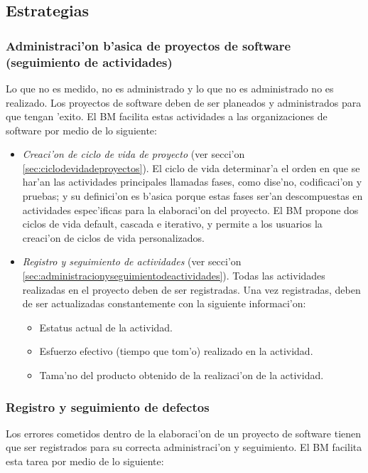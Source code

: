 \subsection{Estrategias}
\label{sec:Estrategias}
\noindent

\subsubsection{Administraci'on b'asica de proyectos de software (seguimiento de actividades)}
\label{sec:Administraci'onb'asicadeproyectosdesoftware}
\noindent
Lo que no es medido, no es administrado y lo que no es administrado no es realizado\cite{Humphrey2002}. Los proyectos de software deben de ser planeados y administrados para que tengan 'exito. El BM facilita estas actividades a las organizaciones de software por medio de lo siguiente:

\begin{itemize}
	\item \emph{Creaci'on de ciclo de vida de proyecto} (ver secci'on \ref{sec:ciclodevidadeproyectos}). El ciclo de vida determinar'a el orden en que se har'an las actividades principales llamadas fases, como dise'no, codificaci'on y pruebas; y su definici'on es b'asica porque estas fases ser'an descompuestas en actividades espec'ificas para la elaboraci'on del proyecto. El BM propone dos ciclos de vida default, cascada e iterativo, y permite a los usuarios la creaci'on de ciclos de vida personalizados.
	\item \emph{Registro y seguimiento de actividades} (ver secci'on \ref{sec:administracionyseguimientodeactividades}). Todas las actividades realizadas en el proyecto deben de ser registradas. Una vez registradas, deben de ser actualizadas constantemente con la siguiente informaci'on:	
	\begin{itemize}
		\item Estatus actual de la actividad.
		\item Esfuerzo efectivo (tiempo que tom'o) realizado en la actividad.
		\item Tama'no del producto obtenido de la realizaci'on de la actividad.
	\end{itemize}
\end{itemize}

\subsubsection{Registro y seguimiento de defectos}
\label{sec:Registroyseguimientodedefectos}
\noindent
Los errores cometidos dentro de la elaboraci'on de un proyecto de software tienen que ser registrados para su correcta administraci'on y seguimiento. El BM facilita esta tarea por medio de lo siguiente:


